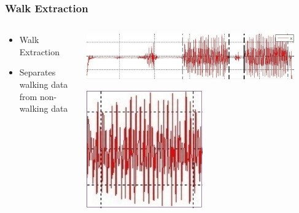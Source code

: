 \documentclass{beamer}
\begin{document}
\begin{frame}
  \frametitle{Walk Extraction}
  \begin{columns}
  \begin{column}{0.4\textwidth}
  \begin{itemize}
    \item Walk Extraction 
  	\linebreak
  	\item Separates walking data from non-walking data
  \end{itemize}
  \end{column}  
  
\begin{column}{0.5\textwidth}

\includegraphics[width=0.91\textwidth]{Illustrations/onegaitcycle.png}

\includegraphics[width=0.51\textwidth]{Illustrations/rawgaitdata.png}

\end{column}   
  
  \end{columns}
\end{frame}
\end{document}
